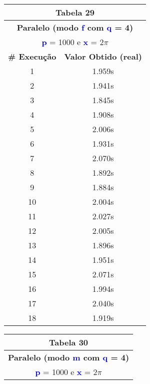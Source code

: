 \documentclass[11pt]{article}
\begin{document}
\begin{table}[!h]
	\begin{center}
		\begin{minipage}{0.48\textwidth}
			\begin{tabular}{| c | c |}
			\hline
			\multicolumn{2}{|c|}{\textbf{Tabela 29}} \\ \hline
			\multicolumn{2}{|c|}{\textbf{Paralelo (modo \textbf{\textcolor{blue}{f}} com \textbf{\textcolor{blue}{q}} = 4)}} \\
			\multicolumn{2}{|c|}{\textbf{\textcolor{blue}{p}} = 1000 e \textbf{\textcolor{blue}{x}} = $2\pi$} \\ [0.2ex]
			\hline
				\textbf{\# Execução} &  \textbf{Valor Obtido (real)} \\ \hline
				1 & 1.959s \\ \hline
				2 & 1.941s \\ \hline
				3 & 1.845s \\ \hline
				4 & 1.908s \\ \hline
				5 & 2.006s \\ \hline
				6 & 1.931s \\ \hline
				7 & 2.070s \\ \hline
				8 & 1.892s \\ \hline
				9 & 1.884s \\ \hline
				10 & 2.004s \\ \hline
				11 & 2.027s \\ \hline
				12 & 2.005s \\ \hline
				13 & 1.896s \\ \hline
				14 & 1.951s \\ \hline
				15 & 2.071s \\ \hline
				16 & 1.994s \\ \hline
				17 & 2.040s \\ \hline
				18 & 1.919s \\ \hline
			\end{tabular}
		\end{minipage}
		\begin{minipage}{0.48\textwidth}
			\begin{tabular}{| c | c |}
			\hline
			\multicolumn{2}{|c|}{\textbf{Tabela 30}} \\ \hline
			\multicolumn{2}{|c|}{\textbf{Paralelo (modo \textbf{\textcolor{blue}{m}} com \textbf{\textcolor{blue}{q}} = 4)}} \\
			\multicolumn{2}{|c|}{\textbf{\textcolor{blue}{p}} = 1000 e \textbf{\textcolor{blue}{x}} = $2\pi$} \\ [0.2ex]

\end{tabular}
\end{minipage}
\end{center}
\end{table}
\end{document}
